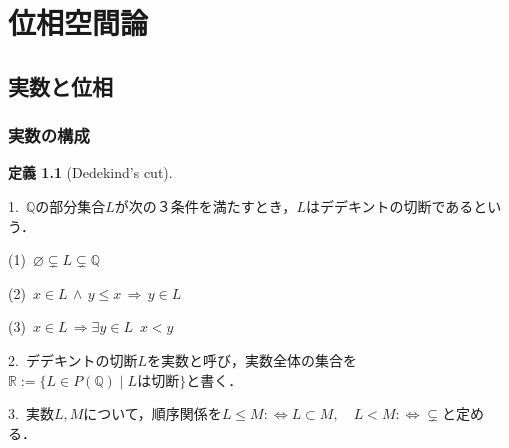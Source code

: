 \documentclass[uplatex, 12pt, dvipdfmx]{jsreport}
\theoremstyle{definition}
\newtheorem{definition}[theorem]{定義}
\theoremstyle{StatementsWithStar}
\theoremstyle{StatementsWithStar2}
\theoremstyle{StatementsWithStar3}
\theoremstyle{StatementsWithCCirc}
\theoremstyle{definition}
\begin{document}
\chapter{位相空間論}

\section{実数と位相}

\subsection{実数の構成}

\begin{definition}[Dedekind's cut]\rm{}　

    1.\, $\mathbb{Q}$の部分集合$L$が次の３条件を満たすとき，$L$はデデキントの切断であるという．

    (1)\, $\varnothing\subsetneq L\subsetneq\mathbb{Q}$

    (2)\, $x\in L \,\wedge\, y\le x \,\Rightarrow\, y\in L$

    (3)\, $x\in L \,\Rightarrow \exists y\in L \,\,\, x<y$

    2.\, デデキントの切断$L$を実数と呼び，実数全体の集合を$\mathbb{R}:=\{ L\in P(\mathbb{Q})\mid Lは切断 \}$と書く．


    3.\, 実数$L,M$について，順序関係を$L\le M :\Leftrightarrow L\subset M,\hspace{1em} L<M :\Leftrightarrow \subsetneq$と定める．
\end{definition}
\end{document}
